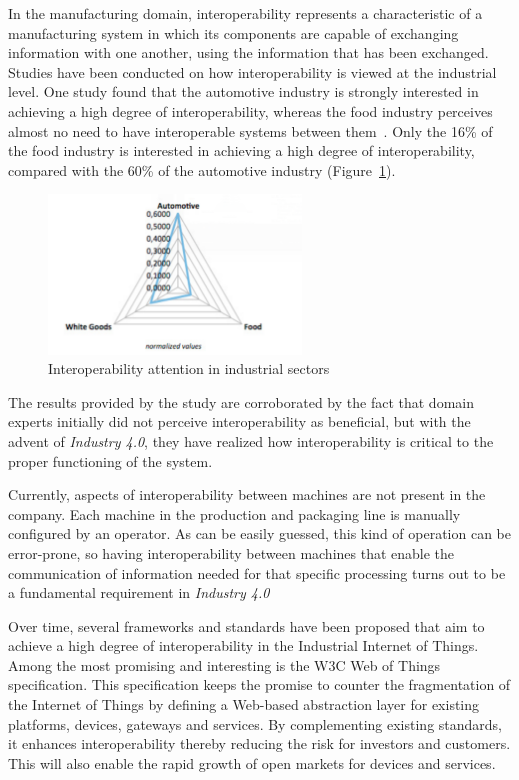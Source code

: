 In the manufacturing domain, interoperability represents a characteristic of a manufacturing system in which its components are capable of exchanging information with one another, using the information that has been exchanged.
Studies have been conducted on how interoperability is viewed at the industrial level. One study found that the automotive industry is strongly interested in achieving a high degree of interoperability, whereas the food industry perceives almost no need to have interoperable systems between them~\cite{LIAO201712434}. Only the 16\% of the food industry is interested in achieving a high degree of interoperability, compared with the 60\% of the automotive industry (Figure~\ref{fig:interoperability}).

\begin{figure}[h]
	\centering
	\includegraphics[width=0.6\textwidth]{img/interoperability.png}
	\caption{Interoperability attention in industrial sectors}
	\label{fig:interoperability}
\end{figure}

The results provided by the study are corroborated by the fact that domain experts initially did not perceive interoperability as beneficial, but
with the advent of \textit{Industry 4.0}, they have realized how interoperability is critical to the proper functioning of the system.

Currently, aspects of interoperability between machines are not present in the company.
Each machine in the production and packaging line is manually configured by an operator.
As can be easily guessed, this kind of operation can be error-prone, so having interoperability between machines that enable the communication of
information needed for that specific processing turns out to be a fundamental requirement in \textit{Industry 4.0}

Over time, several frameworks and standards have been proposed that aim to achieve a high degree of interoperability in the Industrial Internet of
Things. Among the most promising and interesting is the W3C Web of Things specification.
This specification keeps the promise to counter the fragmentation of the Internet of Things by defining a Web-based abstraction layer for existing
platforms, devices, gateways and services.
By complementing existing standards, it enhances interoperability thereby reducing the risk for investors and customers.
This will also enable the rapid growth of open markets for devices and services.

